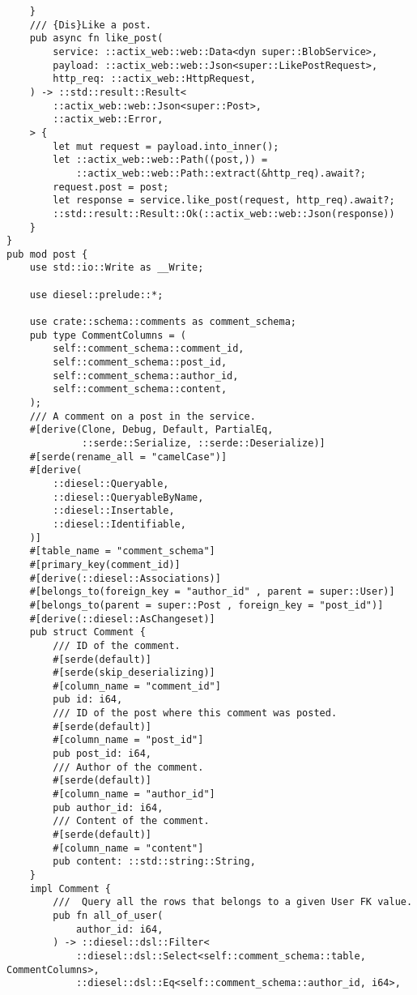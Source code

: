\begin{verbatim}
    }
    /// {Dis}Like a post.
    pub async fn like_post(
        service: ::actix_web::web::Data<dyn super::BlobService>,
        payload: ::actix_web::web::Json<super::LikePostRequest>,
        http_req: ::actix_web::HttpRequest,
    ) -> ::std::result::Result<
        ::actix_web::web::Json<super::Post>,
        ::actix_web::Error,
    > {
        let mut request = payload.into_inner();
        let ::actix_web::web::Path((post,)) =
            ::actix_web::web::Path::extract(&http_req).await?;
        request.post = post;
        let response = service.like_post(request, http_req).await?;
        ::std::result::Result::Ok(::actix_web::web::Json(response))
    }
}
pub mod post {
    use std::io::Write as __Write;

    use diesel::prelude::*;

    use crate::schema::comments as comment_schema;
    pub type CommentColumns = (
        self::comment_schema::comment_id,
        self::comment_schema::post_id,
        self::comment_schema::author_id,
        self::comment_schema::content,
    );
    /// A comment on a post in the service.
    #[derive(Clone, Debug, Default, PartialEq,
             ::serde::Serialize, ::serde::Deserialize)]
    #[serde(rename_all = "camelCase")]
    #[derive(
        ::diesel::Queryable,
        ::diesel::QueryableByName,
        ::diesel::Insertable,
        ::diesel::Identifiable,
    )]
    #[table_name = "comment_schema"]
    #[primary_key(comment_id)]
    #[derive(::diesel::Associations)]
    #[belongs_to(foreign_key = "author_id" , parent = super::User)]
    #[belongs_to(parent = super::Post , foreign_key = "post_id")]
    #[derive(::diesel::AsChangeset)]
    pub struct Comment {
        /// ID of the comment.
        #[serde(default)]
        #[serde(skip_deserializing)]
        #[column_name = "comment_id"]
        pub id: i64,
        /// ID of the post where this comment was posted.
        #[serde(default)]
        #[column_name = "post_id"]
        pub post_id: i64,
        /// Author of the comment.
        #[serde(default)]
        #[column_name = "author_id"]
        pub author_id: i64,
        /// Content of the comment.
        #[serde(default)]
        #[column_name = "content"]
        pub content: ::std::string::String,
    }
    impl Comment {
        ///  Query all the rows that belongs to a given User FK value.
        pub fn all_of_user(
            author_id: i64,
        ) -> ::diesel::dsl::Filter<
            ::diesel::dsl::Select<self::comment_schema::table, CommentColumns>,
            ::diesel::dsl::Eq<self::comment_schema::author_id, i64>,

\end{verbatim}
